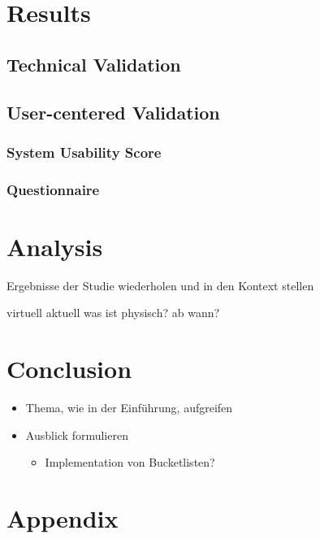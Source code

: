\documentclass[12pt,numbers=noenddot,parskip,bibliography=totocnumbered,listof=totocnumbered]{scrreprt}
\begin{document}
\chapter{Results}

\section{Technical Validation}

\section{User-centered Validation}

\subsection{System Usability Score}

\subsection{Questionnaire}

\chapter{Analysis}
Ergebnisse der Studie wiederholen und in den Kontext stellen

virtuell aktuell was ist physisch? ab wann?

\chapter{Conclusion}
\begin{itemize} 
	\item Thema, wie in der Einführung, aufgreifen
	\item Ausblick formulieren
	\begin{itemize} 
		\item Implementation von Bucketlisten?
	\end{itemize} 
\end{itemize} 

\appendix
\chapter{Appendix}
\newpage
\end{document}
